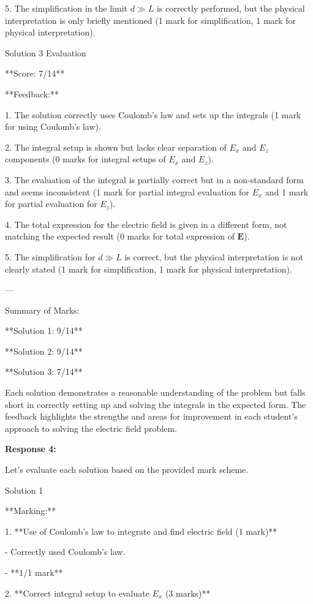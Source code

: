 \documentclass[a4paper,11pt]{article}
\begin{document}
5. The simplification in the limit \( d \gg L \) is correctly performed, but the physical interpretation is only briefly mentioned (1 mark for simplification, 1 mark for physical interpretation).

Solution 3 Evaluation

**Score: 7/14**

**Feedback:**

1. The solution correctly uses Coulomb's law and sets up the integrals (1 mark for using Coulomb's law).

2. The integral setup is shown but lacks clear separation of \( E_x \) and \( E_z \) components (0 marks for integral setups of \( E_x \) and \( E_z \)).

3. The evaluation of the integral is partially correct but in a non-standard form and seems inconsistent (1 mark for partial integral evaluation for \( E_x \) and 1 mark for partial evaluation for \( E_z \)).

4. The total expression for the electric field is given in a different form, not matching the expected result (0 marks for total expression of \(\mathbf{E}\)).

5. The simplification for \( d \gg L \) is correct, but the physical interpretation is not clearly stated (1 mark for simplification, 1 mark for physical interpretation).

---

Summary of Marks:

**Solution 1: 9/14**

**Solution 2: 9/14**

**Solution 3: 7/14**

Each solution demonstrates a reasonable understanding of the problem but falls short in correctly setting up and solving the integrals in the expected form. The feedback highlights the strengths and areas for improvement in each student's approach to solving the electric field problem.

\bigskip
\textbf{Response 4:}

Let's evaluate each solution based on the provided mark scheme. 

Solution 1

**Marking:**

1. **Use of Coulomb's law to integrate and find electric field (1 mark)**

   - Correctly used Coulomb's law.
   
   - **1/1 mark**

2. **Correct integral setup to evaluate \(E_x\) (3 marks)**
\end{document}
